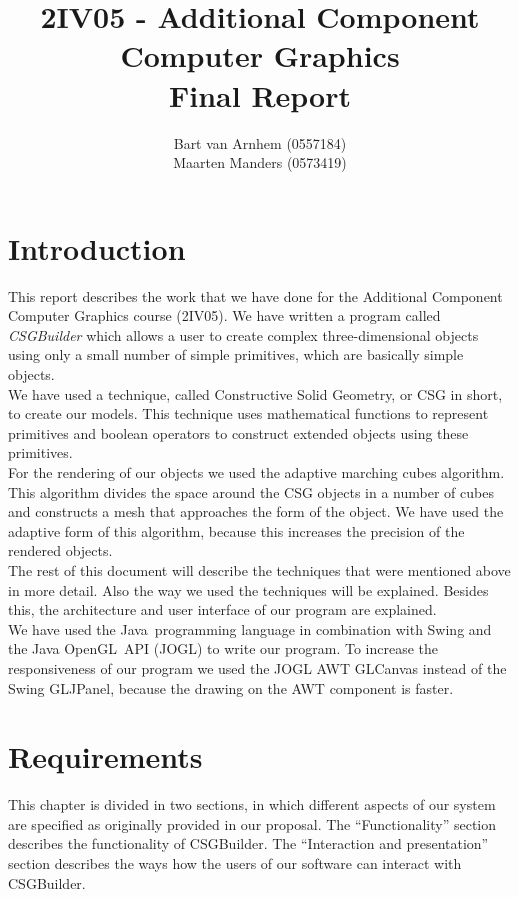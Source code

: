 \documentclass[a4paper,10pt,twocolumn]{article}
\title{2IV05 - Additional Component Computer Graphics \\ Final Report}
\author{Bart van Arnhem (0557184) \\ Maarten Manders (0573419)}
\begin{document}
\maketitle
\thispagestyle{empty}

\onecolumn
\tableofcontents
\setcounter{page}{1}
\twocolumn
\section{Introduction}
This report describes the work that we have done for the Additional Component Computer Graphics course (2IV05). We have written a program called \textit{CSGBuilder} which allows a user to create complex three-dimensional objects using only a small number of simple primitives, which are basically simple objects.\\

We have used a technique, called Constructive Solid Geometry, or CSG in short, to create our models. This technique uses mathematical functions to represent primitives and boolean operators to construct extended objects using these primitives.\\

For the rendering of our objects we used the adaptive marching cubes algorithm. This algorithm divides the space around the CSG objects in a number of cubes and constructs a mesh that approaches the form of the object. We have used the adaptive form of this algorithm, because this increases the precision of the rendered objects.\\

The rest of this document will describe the techniques that were mentioned above in more detail. Also the way we used the techniques will be explained. Besides this, the architecture and user interface of our program are explained.\\

We have used the Java\textcopyright\ programming language in combination with Swing and the Java OpenGL\texttrademark\ API (JOGL) to write our program. To increase the responsiveness of our program we used the JOGL AWT GLCanvas instead of the Swing GLJPanel, because the drawing on the AWT component is faster.

\section{Requirements}
This chapter is divided in two sections, in which different aspects of our system are specified as originally provided in our proposal. The ``Functionality'' section describes the functionality of CSGBuilder. The ``Interaction and presentation'' section describes the ways how the users of our software can interact with CSGBuilder.
\end{document}
